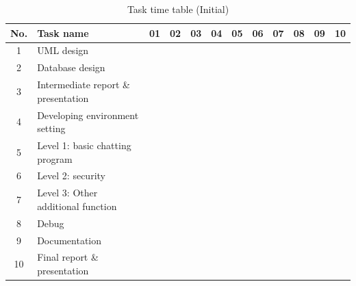 \documentclass[a4paper,11pt]{article}
\begin{document}
\begin{table}[h]
\centering
\caption{Task time table (Initial)}
\label{my-label}
\begin{tabular}{|c|l||c|c|c|c|c|c|c|c|c|c|}
\hline
\rowcolor{No}
No. & Task name & 01 & 02 & 03 & 04 & 05 & 06 & 07 & 08 & 09 & 10 \\ \hline \hline
1 & UML design & \cellcolor{UML} & \cellcolor{UML} &  &  &  &  &  &  &  &  \\ \hline
2 & Database design & \cellcolor{Data} & \cellcolor{Data} &  &  &  &  &  &  &  &  \\ \hline
3 & Intermediate report \& presentation &  & \cellcolor{intermediate} & \cellcolor{intermediate} &  &  &  &  &  &  &  \\ \hline
4 & Developing environment setting &  &  & \cellcolor{environ} & \cellcolor{environ} &  &  &  &  &  &  \\ \hline
5 & Level 1: basic chatting program &  &  & \cellcolor{level2} & \cellcolor{level2} & \cellcolor{level2} &  &  &   &  &  \\ \hline
6 & Level 2: security &  &  &  &  & \cellcolor{level2} & \cellcolor{level2} & \cellcolor{level2} &  &  &  \\ \hline
7 & Level 3: Other additional function &  &  &  &  &  &  & \cellcolor{level3} & \cellcolor{level3} & \cellcolor{level3} &  \\ \hline
8 & Debug &  &  &  &  & \cellcolor{debug} & \cellcolor{debug} & \cellcolor{debug} & \cellcolor{debug} & \cellcolor{debug} & \cellcolor{debug} \\ \hline
9 & Documentation &  &  &  &  & \cellcolor{documentation} &  & \cellcolor{documentation} &  & \cellcolor{documentation} &  \\ \hline
10 & Final report \& presentation &  &  &  &  &  &  &  &  & \cellcolor{final} & \cellcolor{final} \\ \hline
\end{tabular}
\end{table}
\end{document}
